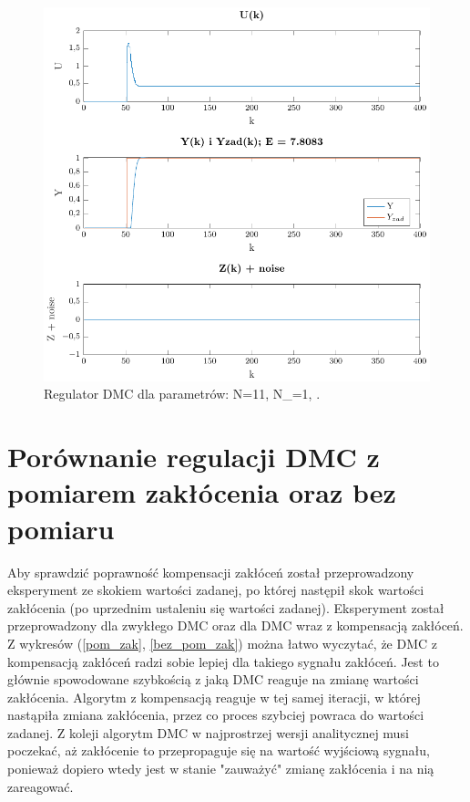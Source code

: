 \documentclass[a4paper,titlepage,11pt,twosides,floatssmall]{mwrep}
\begin{document}
\begin{figure}[H]
	\centering
	\includegraphics[scale=0.85]{../../Lab2/PDF_rysunki/Z4_DMCParametryN_11_Nu_1_lam_1.pdf}
	\caption{Regulator DMC dla parametrów: N=11, N_{}=1, .}
	\label{dobor_param1}
\end{figure}


\section{Porównanie regulacji DMC z pomiarem zakłócenia oraz bez pomiaru}

Aby sprawdzić poprawność kompensacji zakłóceń został przeprowadzony eksperyment ze skokiem wartości zadanej, po której następił skok wartości zakłócenia (po uprzednim ustaleniu się wartości zadanej). Eksperyment został przeprowadzony dla zwykłego DMC oraz dla DMC wraz z kompensacją zakłóceń. Z wykresów (\ref{pom_zak}, \ref{bez_pom_zak})  można łatwo wyczytać, że DMC z kompensacją zakłóceń radzi sobie lepiej dla takiego sygnału zakłóceń. Jest to głównie spowodowane szybkością z jaką DMC reaguje na zmianę wartości zakłócenia. Algorytm z kompensacją reaguje w tej samej iteracji, w której nastąpiła zmiana zakłócenia, przez co proces szybciej powraca do wartości zadanej. Z koleji algorytm DMC w najprostrzej wersji analitycznej musi poczekać, aż zakłócenie to przepropaguje się na wartość wyjściową sygnału, ponieważ dopiero wtedy jest w stanie "zauważyć" zmianę zakłócenia i na nią zareagować. 
\end{document}
